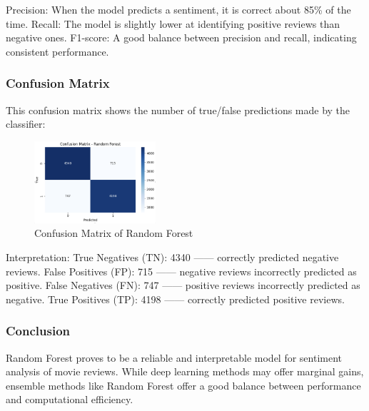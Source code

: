Precision: When the model predicts a sentiment, it is correct about 85\% of the time.
Recall: The model is slightly lower at identifying positive reviews than negative ones.
F1-score: A good balance between precision and recall, indicating consistent performance.

\subsubsection*{Confusion Matrix}
This confusion matrix shows the number of true/false predictions made by the classifier:

\begin{figure}[ht]
    \centering
    \includegraphics[width=0.4\textwidth]{pics/rf_eval_metrix.png}
    \caption{Confusion Matrix of Random Forest}
\end{figure}

Interpretation:
True Negatives (TN): 4340 —— correctly predicted negative reviews.
False Positives (FP): 715 —— negative reviews incorrectly predicted as positive.
False Negatives (FN): 747 —— positive reviews incorrectly predicted as negative.
True Positives (TP): 4198 —— correctly predicted positive reviews.

\subsubsection*{Conclusion}
Random Forest proves to be a reliable and interpretable model for sentiment analysis of movie reviews. While deep learning methods may offer marginal gains, ensemble methods like Random Forest offer a good balance between performance and computational efficiency.


